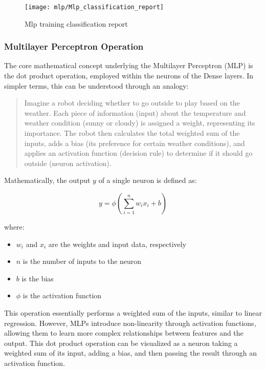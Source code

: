 \begin{figure}[H] 
	\centering
	\texttt{[image: mlp/Mlp\_classification\_report]}
	\caption{Mlp training classification report}\label{fig:mlp_classification_report}
\end{figure}


\subsubsection{Multilayer Perceptron Operation}

The core mathematical concept underlying the Multilayer Perceptron (MLP) is the dot product operation, employed within the neurons of the Dense layers. In simpler terms, this can be understood through an analogy:

\begin{quote}
Imagine a robot deciding whether to go outside to play based on the weather. Each piece of information (input) about the temperature and weather condition (sunny or cloudy) is assigned a weight, representing its importance. The robot then calculates the total weighted sum of the inputs, adds a bias (its preference for certain weather conditions), and applies an activation function (decision rule) to determine if it should go outside (neuron activation).
\end{quote}

Mathematically, the output \(y\) of a single neuron is defined as:

\[
y = \phi \left( \sum_{i=1}^{n} w_i x_i + b \right)
\]

where:
\begin{itemize}
  \item \(w_i\) and \(x_i\) are the weights and input data, respectively
  \item \(n\) is the number of inputs to the neuron
  \item \(b\) is the bias
  \item \(\phi\) is the activation function
\end{itemize}

This operation essentially performs a weighted sum of the inputs, similar to linear regression. However, MLPs introduce non-linearity through activation functions, allowing them to learn more complex relationships between features and the output. This dot product operation can be visualized as a neuron taking a weighted sum of its input, adding a bias, and then passing the result through an activation function.


